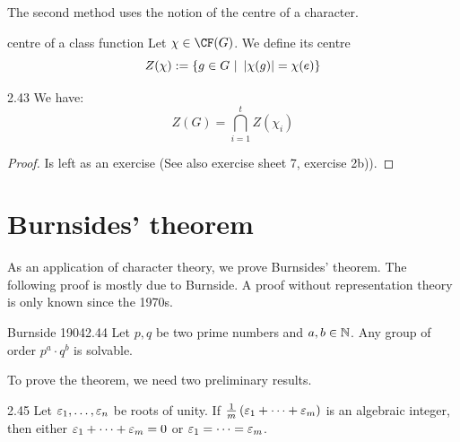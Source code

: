 \documentclass[twoside = false,	%
		headsepline,		%
		parskip = true,
		]{scrbook}						%
\begin{document}
        The second method uses the notion of the centre of a character. 
        \begin{definition*}{centre of a class function}
            Let $\chi\in\CF(G)$. We define its centre $$ Z(\chi):=\curly{g\in G \ | \ \vert{\chi(g)}=\chi(e)}$$
        \end{definition*}
    
        \begin{proposition}{}{2.43}
            We have:
            $$Z(G)=\bigcap_{i=1}^t Z(\chi_i)$$
        \end{proposition}
        \begin{proof}
            Is left as an exercise (See also exercise sheet 7, exercise 2b)).
        \end{proof}
    
\section{Burnsides' theorem}
    As an application of character theory, we prove Burnsides' theorem. The following proof is mostly due to Burnside. A proof without representation theory is only known since the 1970s.
    
    \begin{theorem}{Burnside 1904}{2.44}
        Let $p,q$ be two prime numbers and $a,b \in \mathbb N$. Any group of order $p^a \cdot q^b$ is solvable.
    \end{theorem}

    To prove the theorem, we need two preliminary results.
    
    \begin{lemma}{}{2.45}
        Let $\varepsilon_1,\dots,\varepsilon_n$ be roots of unity. If $\frac{1}{m}\left( \varepsilon_1 + \dots + \varepsilon_m \right)$ is an algebraic integer,
        then either $\varepsilon_1 + \dots + \varepsilon_m = 0$ or $\varepsilon_1 = \dots = \varepsilon_m$.
    \end{lemma}
\end{document}
